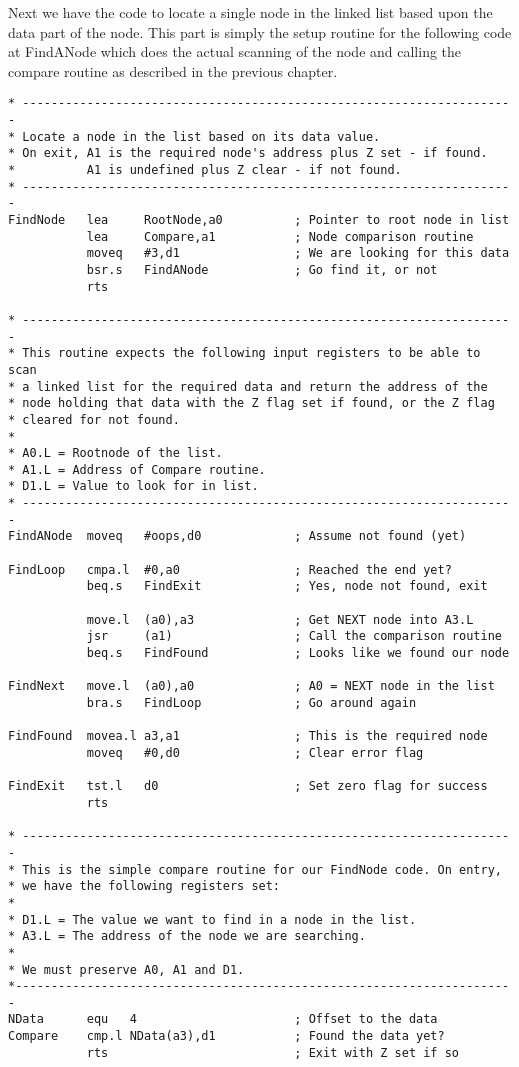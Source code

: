 Next we have the code to locate a single node in the linked list
    based upon the data part of the node. This part is simply the setup
    routine for the following code at FindANode which does the actual scanning
    of the node and calling the compare routine as described in the previous
    chapter.

\begin{lstlisting}[firstnumber=last,caption={Single Linked List - Demo Code - Find Node}]
* ---------------------------------------------------------------------
* Locate a node in the list based on its data value.
* On exit, A1 is the required node's address plus Z set - if found.
*          A1 is undefined plus Z clear - if not found.
* ---------------------------------------------------------------------
FindNode   lea     RootNode,a0          ; Pointer to root node in list
           lea     Compare,a1           ; Node comparison routine
           moveq   #3,d1                ; We are looking for this data
           bsr.s   FindANode            ; Go find it, or not
           rts

* ---------------------------------------------------------------------
* This routine expects the following input registers to be able to scan
* a linked list for the required data and return the address of the
* node holding that data with the Z flag set if found, or the Z flag
* cleared for not found.
*
* A0.L = Rootnode of the list.
* A1.L = Address of Compare routine.
* D1.L = Value to look for in list.
* ---------------------------------------------------------------------
FindANode  moveq   #oops,d0             ; Assume not found (yet)

FindLoop   cmpa.l  #0,a0                ; Reached the end yet?
           beq.s   FindExit             ; Yes, node not found, exit

           move.l  (a0),a3              ; Get NEXT node into A3.L
           jsr     (a1)                 ; Call the comparison routine
           beq.s   FindFound            ; Looks like we found our node

FindNext   move.l  (a0),a0              ; A0 = NEXT node in the list
           bra.s   FindLoop             ; Go around again

FindFound  movea.l a3,a1                ; This is the required node
           moveq   #0,d0                ; Clear error flag

FindExit   tst.l   d0                   ; Set zero flag for success
           rts

* ---------------------------------------------------------------------
* This is the simple compare routine for our FindNode code. On entry, 
* we have the following registers set:
*
* D1.L = The value we want to find in a node in the list.
* A3.L = The address of the node we are searching.
*
* We must preserve A0, A1 and D1.
*----------------------------------------------------------------------
NData      equ   4                      ; Offset to the data
Compare    cmp.l NData(a3),d1           ; Found the data yet?
           rts                          ; Exit with Z set if so
\end{lstlisting}

